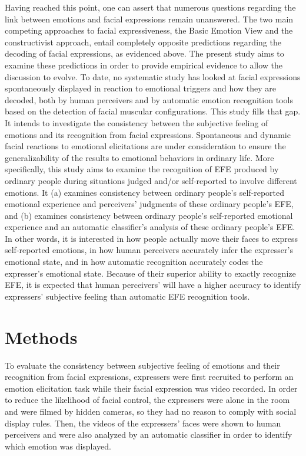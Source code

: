 \documentclass[
  english,
  man]{apa7}
\begin{document}
Having reached this point, one can assert that numerous questions regarding the link between emotions and facial expressions remain unanswered. The two main competing approaches to facial expressiveness, the Basic Emotion View and the constructivist approach, entail completely opposite predictions regarding the decoding of facial expressions, as evidenced above. The present study aims to examine these predictions in order to provide empirical evidence to allow the discussion to evolve. To date, no systematic study has looked at facial expressions spontaneously displayed in reaction to emotional triggers and how they are decoded, both by human perceivers and by automatic emotion recognition tools based on the detection of facial muscular configurations. This study fills that gap. It intends to investigate the consistency between the subjective feeling of emotions and its recognition from facial expressions. Spontaneous and dynamic facial reactions to emotional elicitations are under consideration to ensure the generalizability of the results to emotional behaviors in ordinary life. More specifically, this study aims to examine the recognition of EFE produced by ordinary people during situations judged and/or self-reported to involve different emotions. It (a) examines consistency between ordinary people's self-reported emotional experience and perceivers' judgments of these ordinary people's EFE, and (b) examines consistency between ordinary people's self-reported emotional experience and an automatic classifier's analysis of these ordinary people's EFE. In other words, it is interested in how people actually move their faces to express self-reported emotions, in how human perceivers accurately infer the expresser's emotional state, and in how automatic recognition accurately codes the expresser's emotional state. Because of their superior ability to exactly recognize EFE, it is expected that human perceivers' will have a higher accuracy to identify expressers' subjective feeling than automatic EFE recognition tools.

\hypertarget{methods}{%
\section{Methods}\label{methods}}

To evaluate the consistency between subjective feeling of emotions and their recognition from facial expressions, expressers were first recruited to perform an emotion elicitation task while their facial expression was video recorded. In order to reduce the likelihood of facial control, the expressers were alone in the room and were filmed by hidden cameras, so they had no reason to comply with social display rules. Then, the videos of the expressers' faces were shown to human perceivers and were also analyzed by an automatic classifier in order to identify which emotion was displayed.
\end{document}
